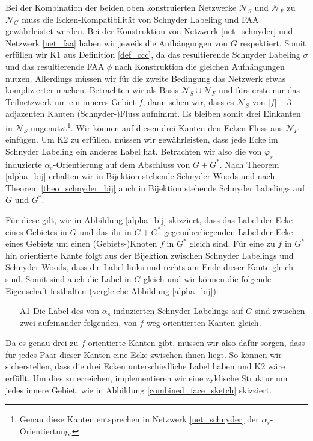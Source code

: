 Bei der Kombination der beiden oben konstruierten Netzwerke $\mathcal{N}_S$ und $\mathcal{N}_F$ zu $\mathcal{N}_G$ muss die Ecken-Kompatibilität von Schnyder Labeling und FAA gewährleistet werden. Bei der Konstruktion von Netzwerk \ref{net_schnyder} und Netzwerk \ref{net_faa} haben wir jeweils die Aufhängungen von $G$ respektiert. Somit erfüllen wir K1 aus Definition \ref{def_ccc}, da das resultierende Schnyder Labeling $\sigma$ und das resultierende FAA $\phi$ nach Konstruktion die gleichen Aufhängungen nutzen. Allerdings müssen wir für die zweite Bedingung das Netzwerk etwas komplizierter machen. Betrachten wir als Basis $\mathcal{N}_S \cup \mathcal{N}_F$ und fürs erste nur das Teilnetzwerk um ein inneres Gebiet $f$, dann sehen wir, dass es $\mathcal{N}_S$ von $|f|-3$ adjazenten Kanten (Schnyder-)Fluss aufnimmt. Es bleiben somit drei Einkanten in $\mathcal{N}_S$ ungenutzt\footnote{Genau diese Kanten entsprechen in Netzwerk \ref{net_schnyder} der $\alpha_s$-Orientiertung.}. Wir können auf diesen drei Kanten den Ecken-Fluss aus $\mathcal{N}_F$ einfügen. Um K2 zu erfüllen, müssen wir gewährleisten, dass jede Ecke im Schnyder Labeling ein anderes Label hat. Betrachten wir also die von $\varphi_s$ induzierte $\alpha_s$-Orientierung auf dem Abschluss von $G+G^*$. Nach Theorem \ref{alpha_bij} erhalten wir in Bijektion stehende Schnyder Woods und nach Theorem \ref{theo_schnyder_bij} auch in Bijektion stehende Schnyder Labelings auf $G$ und $G^*$.

Für diese gilt, wie in Abbildung \ref{alpha_bij} skizziert, dass das Label der Ecke eines Gebietes in $G$ und das ihr in $G+G^*$ gegenüberliegenden Label der Ecke eines Gebiets um einen (Gebiets-)Knoten $f$ in $G^*$ gleich sind. Für eine zu $f$ in $G^*$ hin orientierte Kante folgt aus der Bijektion zwischen Schnyder Labelings und Schnyder Woods, dass die Label links und rechts am Ende dieser Kante gleich sind. Somit sind auch die Label in $G$ gleich und wir können die folgende Eigenschaft festhalten (vergleiche Abbildung \ref{alpha_bij}):

\begin{itemize}
\item [A1] Die Label des von $\alpha_s$ induzierten Schnyder Labelings auf $G$ sind zwischen zwei aufeinander folgenden, von $f$ weg orientierten Kanten gleich.
\end{itemize}

Da es genau drei zu $f$ orientierte Kanten gibt, müssen wir also dafür sorgen, dass für jedes Paar dieser Kanten eine Ecke zwischen ihnen liegt. So können wir sicherstellen, dass die drei Ecken unterschiedliche Label haben und K2 wäre erfüllt. Um dies zu erreichen, implementieren wir eine zyklische Struktur um jedes innere Gebiet, wie in Abbildung \ref{combined_face_sketch} skizziert.

